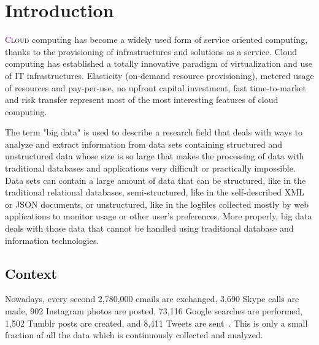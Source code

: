 \chapter{Introduction} \label{chap:Introduction}

\lettrine[lines=4]{\textcolor{purple}{C}}{loud} computing has become a widely used form of service oriented computing, thanks to the provisioning of infrastructures and solutions as a service. Cloud computing has established a totally innovative paradigm of virtualization and use of IT infrastructures. Elasticity (on-demand resource provisioning), metered usage of resources and pay-per-use, no upfront capital investment, fast time-to-market and risk transfer represent most of the most interesting features of cloud computing.

The term "big data" is used to describe a research field that deals with ways to analyze and extract information from data sets containing structured and unstructured data whose size is so large that makes the processing of data with traditional databases and applications very difficult or practically impossible. Data sets can contain a large amount of data that can be structured, like in the traditional relational databases, semi-structured, like in the self-described XML or JSON documents, or unstructured, like in the logfiles collected mostly by web applications to monitor usage or other user's preferences. More properly, big data deals with those data that cannot be handled using traditional database and information technologies. 

\section{Context}\label{sec:context}
Nowadays, every second 2,780,000 emails are exchanged, 3,690 Skype calls are made, 902 Instagram photos are posted, 73,116 Google searches are performed, 1,502 Tumblr posts are created, and 8,411 Tweets are sent~\cite{misc:InternetLiveStats}. This is only a small fraction af all the data which is continuously collected and analyzed.

